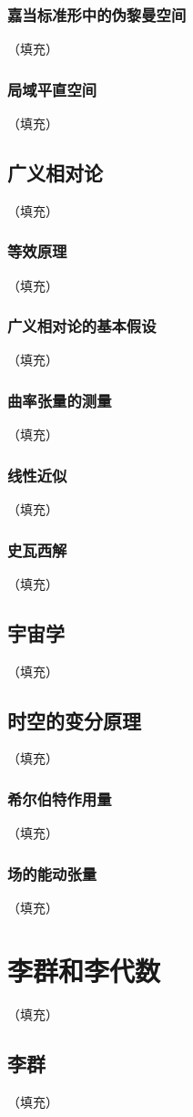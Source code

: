 \documentclass[hyperref,UTF8]{ctexbook}
\begin{document}
\subsection{嘉当标准形中的伪黎曼空间}（填充）
\subsection{局域平直空间}（填充）
\section{广义相对论}（填充）
\subsection{等效原理}（填充）
\subsection{广义相对论的基本假设}（填充）
\subsection{曲率张量的测量}（填充）
\subsection{线性近似}（填充）
\subsection{史瓦西解}（填充）
\section{宇宙学}（填充）
\section{时空的变分原理}（填充）
\subsection{希尔伯特作用量}（填充）
\subsection{场的能动张量}（填充）
\chapter{李群和李代数}（填充）
\section{李群}（填充）
\end{document}
